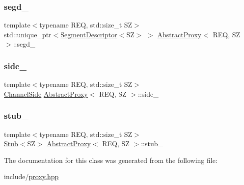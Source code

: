 \mbox{\label{classAbstractProxy_a747e1ccbb8314755f6218ab34b29c5cb}} 
\subsubsection{\texorpdfstring{segd\+\_\+}{segd\_}}
{\footnotesize\ttfamily template$<$typename R\+EQ, std\+::size\+\_\+t SZ$>$ \\
std\+::unique\+\_\+ptr$<$\hyperlink{classSegmentDescriptor}{Segment\+Descriptor}$<$SZ$>$ $>$ \hyperlink{classAbstractProxy}{Abstract\+Proxy}$<$ R\+EQ, SZ $>$\+::segd\+\_\+\hspace{0.3cm}{\ttfamily [protected]}}

\mbox{\label{classAbstractProxy_a15f6c1ab1f6a16ac7ba7a2d6e7bf8744}} 
\subsubsection{\texorpdfstring{side\+\_\+}{side\_}}
{\footnotesize\ttfamily template$<$typename R\+EQ, std\+::size\+\_\+t SZ$>$ \\
\hyperlink{proxy_8hpp_a249fda9ad200a554304ecf8de90d6877}{Channel\+Side} \hyperlink{classAbstractProxy}{Abstract\+Proxy}$<$ R\+EQ, SZ $>$\+::side\+\_\+\hspace{0.3cm}{\ttfamily [protected]}}

\mbox{\label{classAbstractProxy_a2436619808b225e493b2e8745158b49d}} 
\subsubsection{\texorpdfstring{stub\+\_\+}{stub\_}}
{\footnotesize\ttfamily template$<$typename R\+EQ, std\+::size\+\_\+t SZ$>$ \\
\hyperlink{classStub}{Stub}$<$SZ$>$ \hyperlink{classAbstractProxy}{Abstract\+Proxy}$<$ R\+EQ, SZ $>$\+::stub\+\_\+\hspace{0.3cm}{\ttfamily [protected]}}



The documentation for this class was generated from the following file\+:\begin{DoxyCompactItemize}
\item 
include/\hyperlink{proxy_8hpp}{proxy.\+hpp}\end{DoxyCompactItemize}
